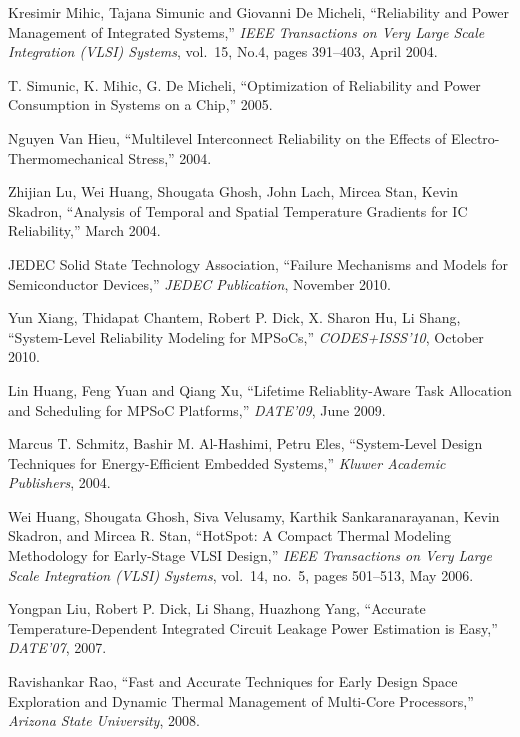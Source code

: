 \begin{thebibliography}{99}
    Kresimir Mihic, Tajana Simunic and Giovanni De Micheli,
    ``Reliability and Power Management of Integrated Systems,''
    \emph{IEEE Transactions on Very Large Scale Integration (VLSI) Systems},
    vol.~15, No.4, pages 391--403, April 2004.

    T. Simunic, K. Mihic, G. De Micheli,
    ``Optimization of Reliability and Power Consumption in Systems on a Chip,''
    2005.

    Nguyen Van Hieu,
    ``Multilevel Interconnect Reliability on the Effects of Electro-Thermomechanical Stress,''
    2004.

    Zhijian Lu, Wei Huang, Shougata Ghosh, John Lach, Mircea Stan, Kevin Skadron,
    ``Analysis of Temporal and Spatial Temperature Gradients for IC Reliability,''
    March 2004.

    JEDEC Solid State Technology Association,
    ``Failure Mechanisms and Models for Semiconductor Devices,''
    \emph{JEDEC Publication},
    November 2010.

    Yun Xiang, Thidapat Chantem, Robert P. Dick, X. Sharon Hu, Li Shang,
    ``System-Level Reliability Modeling for MPSoCs,''
    \emph{CODES+ISSS'10},
    October 2010.

    Lin Huang, Feng Yuan and Qiang Xu,
    ``Lifetime Reliablity-Aware Task Allocation and Scheduling for MPSoC Platforms,''
    \emph{DATE'09},
    June 2009.

    Marcus T. Schmitz, Bashir M. Al-Hashimi, Petru Eles,
    ``System-Level Design Techniques for Energy-Efficient Embedded Systems,''
    \emph{Kluwer Academic Publishers},
    2004.

    Wei Huang, Shougata Ghosh, Siva Velusamy, Karthik Sankaranarayanan, Kevin Skadron, and Mircea R. Stan,
    ``HotSpot: A Compact Thermal Modeling Methodology for Early-Stage VLSI Design,''
    \emph{IEEE Transactions on Very Large Scale Integration (VLSI) Systems},
    vol.~14, no.~5, pages 501--513, May 2006.

    Yongpan Liu, Robert P. Dick, Li Shang, Huazhong Yang,
    ``Accurate Temperature-Dependent Integrated Circuit Leakage Power Estimation is Easy,''
    \emph{DATE'07},
    2007.

    Ravishankar Rao,
    ``Fast and Accurate Techniques for Early Design Space Exploration and Dynamic Thermal Management of Multi-Core Processors,''
    \emph{Arizona State University},
    2008.


\end{thebibliography}
